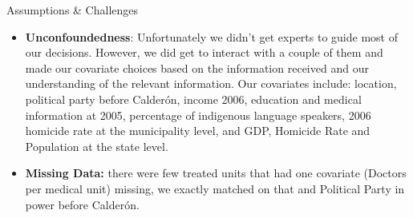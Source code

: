 \documentclass[final]{beamer}
\newlength{\onecolwid}
\newlength{\threecolwid}
\begin{document}
\begin{frame}[t]
\begin{columns}[t]
\begin{column}{\threecolwid}
\begin{block}{Assumptions \& Challenges}
\begin{itemize}
\begin{itemize}
		Put the image of the intervention map next to it
			\end{itemize}
				\item \textbf{Unconfoundedness}: Unfortunately we didn't get experts to guide most of our decisions. However, we did get to interact with a couple of them and made our covariate choices based on the information received and our understanding of the relevant information. Our covariates include: location, political party before Calder\'{o}n, income 2006, education and medical information at 2005, percentage of indigenous language speakers, 2006 homicide rate at the municipality level, and GDP, Homicide Rate and Population at the state level.
				\item \textbf{Missing Data:} there were few treated units that had one covariate (Doctors per medical unit) missing, we exactly matched on that and Political Party in power before Calder\'{o}n.				
			\end{itemize}	
				
			
			

	 \end{block}
      \begin{columns}[t,totalwidth=\threecolwid]	%
        \begin{column}{\onecolwid}


\end{column}
\end{columns}
\end{column}
\end{columns}
\end{frame}
\end{document}
